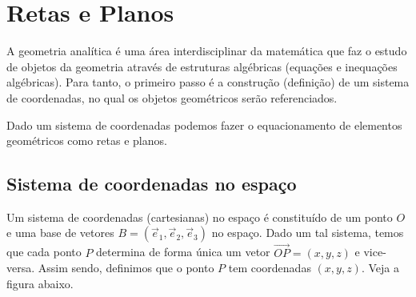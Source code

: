
\chapter{Retas e Planos}\label{cap_estudo}
\badgeRevisar

A geometria analítica é uma área interdisciplinar da matemática que faz o estudo de objetos da geometria através de estruturas algébricas (equações e inequações algébricas). Para tanto, o primeiro passo é a construção (definição) de um sistema de coordenadas, no qual os objetos geométricos serão referenciados.

Dado um sistema de coordenadas podemos fazer o equacionamento de elementos geométricos como retas e planos.

\section{Sistema de coordenadas no espaço}\label{cap_estudo_sec_scoord}
\badgeRevisar


Um sistema de coordenadas (cartesianas\descartes) no espaço é constituído de um ponto $O$ e uma base de vetores $B = (\vec{e}_1, \vec{e}_2, \vec{e}_3)$ no espaço. Dado um tal sistema, temos que cada ponto $P$ determina de forma única um vetor $\overrightarrow{OP} = (x,y,z)$ e vice-versa. Assim sendo, definimos que o ponto $P$ tem coordenadas $(x,y,z)$. Veja a figura abaixo.

